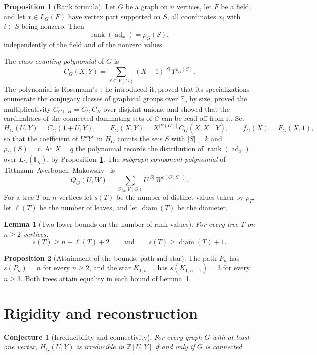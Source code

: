 \documentclass[11pt]{article}
\newtheorem{conjecture}{Conjecture}
\newtheorem{lemma}{Lemma}
\theoremstyle{definition}
\newcommand{\rank}{\operatorname{rank}}
\newcommand{\Fq}{\mathbb F}
\newcommand{\Z}{\mathbb Z}
\providecommand{\Z}{\mathbb Z}
\newtheorem{proposition}{Proposition}
\begin{document}
\begin{proposition}[Rank formula]\label{u:rank}
Let $G$ be a graph on $n$ vertices, let $F$ be a field, and let $x\in L_G(F)$ have vertex part supported on $S$, all coordinates $x_i$ with $i\in S$ being nonzero.  Then
\[
\rank(\operatorname{ad}_x)=\rho_G(S),
\]
independently of the field and of the nonzero values.
\end{proposition}

The \emph{class-counting polynomial} of $G$ is
\[
C_G(X,Y)=\sum_{S\subseteq V(G)}(X-1)^{|S|}\,Y^{\rho_G(S)} .
\]
The polynomial is Rossmann's~\cite{Ros22}: he introduced it, proved that its specializations enumerate the conjugacy classes of graphical groups over $\Fq_q$ by size, proved the multiplicativity $C_{G\sqcup H}=C_G\,C_H$ over disjoint unions, and showed that the cardinalities of the connected dominating sets of $G$ can be read off from it.  Set
\[
H_G(U,Y)=C_G(1+U,Y),\qquad
F_G(X,Y)=X^{|E(G)|}\,C_G(X,X^{-1}Y),\qquad
f_G(X)=F_G(X,1),
\]
so that the coefficient of $U^kY^r$ in $H_G$ counts the sets $S$ with $|S|=k$ and $\rho_G(S)=r$.  At $X=q$ the polynomial records the distribution of $\rank(\operatorname{ad}_x)$ over $L_G(\Fq_q)$, by Proposition~\ref{u:rank}.  The \emph{subgraph-component polynomial} of Tittmann--Averbouch--Makowsky~\cite{TAM11} is
\[
Q_G(U,W)=\sum_{S\subseteq V(G)}U^{|S|}\,W^{c(G[S])} .
\]
For a tree $T$ on $n$ vertices let $s(T)$ be the number of distinct values taken by $\rho_T$, let $\ell(T)$ be the number of leaves, and let $\operatorname{diam}(T)$ be the diameter.

\begin{lemma}[Two lower bounds on the number of rank values]\label{u:sbounds}
For every tree $T$ on $n\ge2$ vertices,
\[
s(T)\ge n-\ell(T)+2
\qquad\text{and}\qquad
s(T)\ge\operatorname{diam}(T)+1 .
\]
\end{lemma}

\begin{proposition}[Attainment of the bounds: path and star]\label{u:pathstar}
The path $P_n$ has $s(P_n)=n$ for every $n\ge2$, and the star $K_{1,n-1}$ has $s(K_{1,n-1})=3$ for every $n\ge3$.  Both trees attain equality in each bound of Lemma~\ref{u:sbounds}.
\end{proposition}

\section{Rigidity and reconstruction}

\begin{conjecture}[Irreducibility and connectivity]\label{u1}
For every graph $G$ with at least one vertex, $H_G(U,Y)$ is irreducible in $\Z[U,Y]$ if and only if $G$ is connected.
\end{conjecture}
\end{document}
